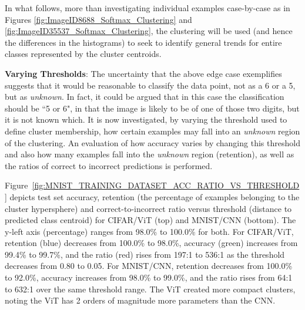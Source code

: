 In what follows, more than investigating individual examples case-by-case as in Figures \ref{fig:ImageID8688_Softmax_Clustering} and \ref{fig:ImageID35537_Softmax_Clustering}, the clustering will be used (and hence the differences in the histograms) to seek to identify general trends for entire classes represented by the cluster centroids.

\textbf{Varying Thresholds}: The uncertainty that the above edge case exemplifies suggests that it would be reasonable to classify the data point, not as a 6 or a 5, but as \textit{unknown}. In fact, it could be argued that in this case the classification should be ``5 or 6", in that the image is likely to be of one of those two digits, but it is not known which. It is now investigated, by varying the threshold used to define cluster membership, how certain examples may fall into an \textit{unknown} region of the clustering. An evaluation of how accuracy varies by changing this threshold and also how many examples fall into the \textit{unknown} region (retention), as well as the ratios of correct to incorrect predictions is performed. 

Figure~\ref{fig:MNIST_TRAINING_DATASET_ACC_RATIO_VS_THRESHOLD} depicts test set accuracy, retention (the percentage of examples belonging to the cluster hypersphere) and correct-to-incorrect ratio versus threshold (distance to predicted class centroid) for CIFAR/ViT (top) and MNIST/CNN (bottom). The y-left axis (percentage) ranges from 98.0\% to 100.0\% for both. For CIFAR/ViT, retention (blue) decreases from 100.0\% to 98.0\%, accuracy (green) increases from 99.4\% to 99.7\%, and the ratio (red) rises from 197:1 to 536:1 as the threshold decreases from 0.80 to 0.05. For MNIST/CNN, retention decreases from 100.0\% to 92.0\%, accuracy increases from 98.0\% to 99.0\%, and the ratio rises from 64:1 to 632:1 over the same threshold range. The ViT created more compact clusters, noting the ViT has 2 orders of magnitude more parameters than the CNN.


